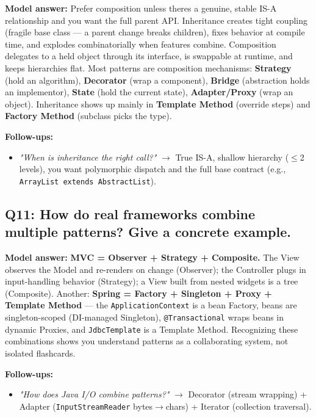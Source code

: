 \documentclass[11pt]{article}
\providecommand{\tightlist}{\setlength{\itemsep}{1pt}\setlength{\parskip}{0pt}}
\begin{document}
\textbf{Model answer:} Prefer composition unless there\textquotesingle s a genuine, stable IS-A relationship and you want the full parent API. Inheritance creates tight coupling (fragile base class --- a parent change breaks children), fixes behavior at compile time, and explodes combinatorially when features combine. Composition delegates to a held object through its interface, is swappable at runtime, and keeps hierarchies flat. Most patterns are composition mechanisms: \textbf{Strategy} (hold an algorithm), \textbf{Decorator} (wrap a component), \textbf{Bridge} (abstraction holds an implementor), \textbf{State} (hold the current state), \textbf{Adapter/Proxy} (wrap an object). Inheritance shows up mainly in \textbf{Template Method} (override steps) and \textbf{Factory Method} (subclass picks the type).

\textbf{Follow-ups:}

\begin{itemize}
\tightlist
\item
  \emph{"When is inheritance the right call?"} \(\rightarrow\) True IS-A, shallow hierarchy (\(\leq\)2 levels), you want polymorphic dispatch and the full base contract (e.g., \texttt{ArrayList\ extends\ AbstractList}).
\end{itemize}

\subsection{Q11: How do real frameworks combine multiple patterns? Give a concrete example.}\label{q11-how-do-real-frameworks-combine-multiple-patterns-give-a-concrete-example}

\textbf{Model answer:} \textbf{MVC = Observer + Strategy + Composite.} The View observes the Model and re-renders on change (Observer); the Controller plugs in input-handling behavior (Strategy); a View built from nested widgets is a tree (Composite). Another: \textbf{Spring = Factory + Singleton + Proxy + Template Method} --- the \texttt{ApplicationContext} is a bean Factory, beans are singleton-scoped (DI-managed Singleton), \texttt{@Transactional} wraps beans in dynamic Proxies, and \texttt{JdbcTemplate} is a Template Method. Recognizing these combinations shows you understand patterns as a collaborating system, not isolated flashcards.

\textbf{Follow-ups:}

\begin{itemize}
\tightlist
\item
  \emph{"How does Java I/O combine patterns?"} \(\rightarrow\) Decorator (stream wrapping) + Adapter (\texttt{InputStreamReader} bytes\(\rightarrow\)chars) + Iterator (collection traversal).
\end{itemize}
\end{document}
